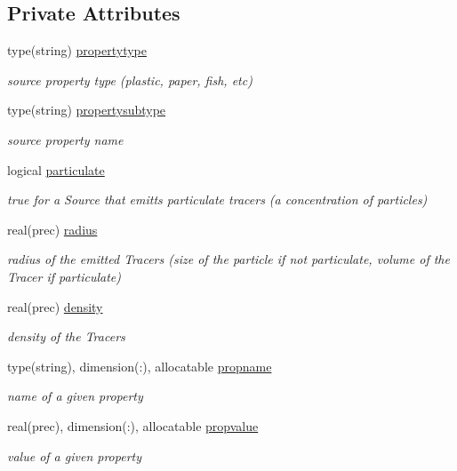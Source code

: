 \subsection*{Private Attributes}
\begin{DoxyCompactItemize}
\item 
type(string) \mbox{\hyperlink{structsources__mod_1_1source__prop_ad1b7ee214a68f28d2298847ae63154cf}{propertytype}}
\begin{DoxyCompactList}\small\item\em source property type (plastic, paper, fish, etc) \end{DoxyCompactList}\item 
type(string) \mbox{\hyperlink{structsources__mod_1_1source__prop_aa1f7e8b3d4cb5fb2d53686524c192a91}{propertysubtype}}
\begin{DoxyCompactList}\small\item\em source property name \end{DoxyCompactList}\item 
logical \mbox{\hyperlink{structsources__mod_1_1source__prop_af02d964cfaa712c12127327719794fde}{particulate}}
\begin{DoxyCompactList}\small\item\em true for a Source that emitts particulate tracers (a concentration of particles) \end{DoxyCompactList}\item 
real(prec) \mbox{\hyperlink{structsources__mod_1_1source__prop_af4cc47a1f8a8d28088150eba368d80a5}{radius}}
\begin{DoxyCompactList}\small\item\em radius of the emitted Tracers (size of the particle if not particulate, volume of the Tracer if particulate) \end{DoxyCompactList}\item 
real(prec) \mbox{\hyperlink{structsources__mod_1_1source__prop_ac569c18f02e33c5ca95f423bcb9fb30e}{density}}
\begin{DoxyCompactList}\small\item\em density of the Tracers \end{DoxyCompactList}\item 
type(string), dimension(\+:), allocatable \mbox{\hyperlink{structsources__mod_1_1source__prop_a2f979ab9110ca8df63e276a2a04d5002}{propname}}
\begin{DoxyCompactList}\small\item\em name of a given property \end{DoxyCompactList}\item 
real(prec), dimension(\+:), allocatable \mbox{\hyperlink{structsources__mod_1_1source__prop_a7d82686562092b327fae70c8f3c89b01}{propvalue}}
\begin{DoxyCompactList}\small\item\em value of a given property \end{DoxyCompactList}\end{DoxyCompactItemize}


